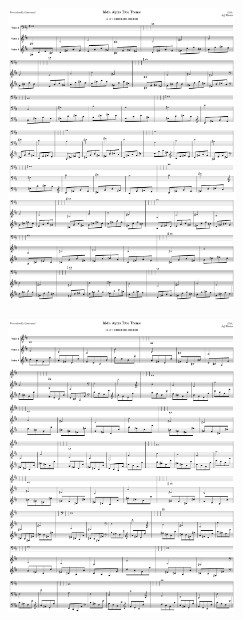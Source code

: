 \begin{figure}[H]                                             
{                                                             
  \setlength{\tabcolsep}{3.0pt}                               
  \setlength\cmidrulewidth{\heavyrulewidth} %
    \begin{subfigure}{0.5\textwidth}                            
  \includegraphics[width=6cm]{music/title_no_13_page_1001.png}%
    \end{subfigure}                                             
  \begin{subfigure}{0.5\textwidth}                            
  \includegraphics[width=6cm]{music/title_no_14_page_1001.png}%
    \end{subfigure}                                             
}                                                             
\end{figure}                                                  



